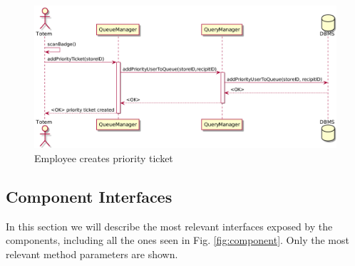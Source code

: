 \begin{figure}[H]
    \includegraphics[width=\linewidth]{uml/seq_priority_ticket_creation.png}
    \caption{Employee creates priority ticket}
    \label{fig:seq_priority_ticket}
\end{figure}

\newpage

\subsection{Component Interfaces}
In this section we will describe the most relevant interfaces exposed by the components, including all the ones seen in Fig. \ref{fig:component}. Only the most relevant method parameters are shown. 

